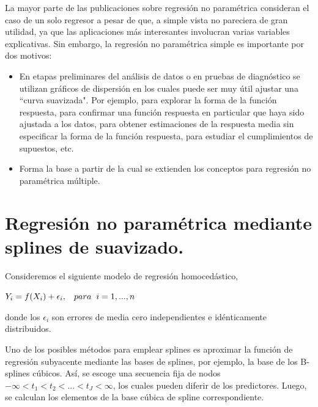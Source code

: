 \hspace{0.4cm} La mayor parte de las publicaciones sobre regresi\'on no param\'etrica consideran el caso de un solo regresor a pesar de que, a simple vista no pareciera de gran utilidad, ya que las aplicaciones m\'as interesantes involucran varias variables explicativas. Sin embargo, la regresi\'on no param\'etrica simple es importante por dos motivos:


\begin{itemize}
  \item En etapas preliminares del an\'alisis de datos o en pruebas de diagn\'ostico se utilizan gr\'aficos de dispersi\'on en los cuales puede ser muy \'util ajustar una ``curva suavizada". Por ejemplo, para explorar la forma de la funci\'on respuesta, para confirmar una funci\'on respuesta en particular que haya sido ajustada a los datos, para obtener estimaciones de la respuesta media sin especificar la forma de la funci\'on respuesta, para estudiar el cumplimientos de supuestos, etc.
  \item Forma la base a partir de la cual se extienden los conceptos para regresi\'on no param\'etrica m\'ultiple.
\end{itemize}

\newpage

\section{Regresi\'on no param\'etrica mediante splines de suavizado.}

\hspace{0.4cm} Consideremos el siguiente modelo de regresi\'on homoced\'astico,\\

\begin{center}

$\displaystyle{Y_{i}=f(X_{i})+\epsilon_{i}}, \hspace{0.3cm} para \hspace{0.2cm} i=1,...,n$
\end{center}

\vspace{0.2cm}

\noindent donde los $\epsilon_{i}$ son errores de media cero independientes e id\'enticamente distribuidos.


\hspace{0.4cm} Uno de los posibles m\'etodos para emplear splines es aproximar la funci\'on de regresi\'on subyacente mediante las bases de splines, por ejemplo, la base de los B-splines c\'ubicos. As\'i, se escoge una secuencia fija de nodos $-\infty<t_{1}<t_{2}<...<t_{J}<\infty$, los cuales pueden diferir de los predictores. Luego, se calculan los elementos de la base c\'ubica de spline correspondiente.


